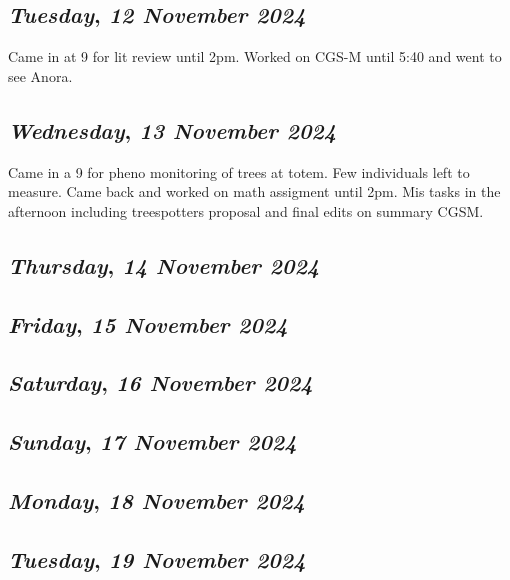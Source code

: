 \def\day{\textit{12 November 2024}}
\def\weekday{\textit{Tuesday}}
\subsection*{\weekday, \day}
Came in at 9 for lit review until 2pm. Worked on CGS-M until 5:40 and went to see Anora. 

\def\day{\textit{13 November 2024}}
\def\weekday{\textit{Wednesday}}
\subsection*{\weekday, \day}
Came in a 9 for pheno monitoring of trees at totem. Few individuals left to measure. Came back and worked on math assigment until 2pm. Mis tasks in the afternoon including treespotters proposal and final edits on summary CGSM.
\def\day{\textit{14 November 2024}}
\def\weekday{\textit{Thursday}}
\subsection*{\weekday, \day}

\def\day{\textit{15 November 2024}}
\def\weekday{\textit{Friday}}
\subsection*{\weekday, \day}

\def\day{\textit{16 November 2024}}
\def\weekday{\textit{Saturday}}
\subsection*{\weekday, \day}

\def\day{\textit{17 November 2024}}
\def\weekday{\textit{Sunday}}
\subsection*{\weekday, \day}

\def\day{\textit{18 November 2024}}
\def\weekday{\textit{Monday}}
\subsection*{\weekday, \day}

\def\day{\textit{19 November 2024}}
\def\weekday{\textit{Tuesday}}
\subsection*{\weekday, \day}

